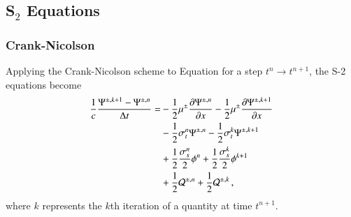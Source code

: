 \documentclass[preprint,12pt]{elsarticle}
\begin{document}
\subsection{\texorpdfstring{S$_2$}{S-2} Equations}
\subsubsection{Crank-Nicolson}
Applying the Crank-Nicolson scheme to Equation  for a step
$t^n\rightarrow t^{n+1}$, the S-2 equations become
\begin{equation}\lequ{S2CN}\begin{split}
  \frac{1}{c}\frac{\Psi^{\pm,k+1}-\Psi^{\pm,n}}{\dt} = &
  -\half\mu^\pm\dydx{\Psi^{\pm,n}} -\half\mu^\pm\dydx{\Psi^{\pm,k+1}}\\
  &-\half\sigma_t^n\Psi^{\pm,n} -\half\sigma_t^k\Psi^{\pm,k+1}\\
  &+\half\frac{\sigma_s^n}{2}\phi^n +\half\frac{\sigma_s^k}{2}\phi^{k+1}\\
  &+\half\Q^{\pm,n} +\half\Q^{\pm,k} \pec
\end{split}\end{equation}
where $k$ represents the $k$th iteration of a quantity at time $t^{n+1}$.
\end{document}
